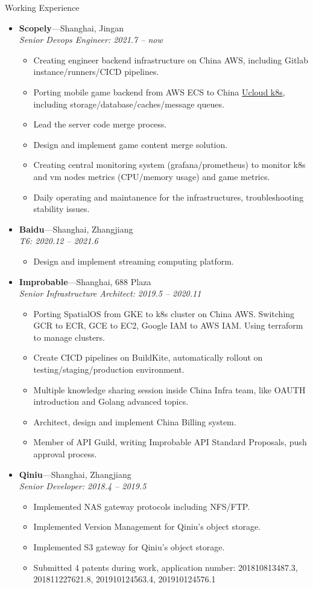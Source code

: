 \documentclass[11pt,oneside]{article}
\newenvironment{ressection}[1]{
	\vspace{4pt}
	{\selectfont\Large#1}
	\begin{itemize}
	\vspace{3pt}
}{
	\end{itemize}
}
\newcommand{\ressubitem}[1]{
	\vspace{-1pt}
	\item \begin{flushleft} #1 \end{flushleft}
}
\newcommand{\resbigitem}[3]{
	\vspace{-5pt}
	\item
	\textbf{#1}---#2 \\
	\textit{#3}
}
\newenvironment{ressubsec}[3]{
	\resbigitem{#1}{#2}{#3}
	\vspace{-2pt}
	\begin{itemize}
}{
    \end{itemize}
}
\begin{document}
\begin{ressection}{Working Experience}

	\begin{ressubsec}{Scopely}{Shanghai, Jingan}{Senior Devops Engineer: 2021.7 -- now}
		\ressubitem{Creating engineer backend infrastructure on China AWS, including Gitlab instance/runners/CICD pipelines.}
		\ressubitem{Porting mobile game backend from AWS ECS to China \href{ucloud.cn}{Ucloud k8s}, including storage/database/caches/message queues.}
		\ressubitem{Lead the server code merge process.}
		\ressubitem{Design and implement game content merge solution.}
		\ressubitem{Creating central monitoring system (grafana/prometheus) to monitor k8s and vm nodes metrics (CPU/memory usage) and game metrics.}
		\ressubitem{Daily operating and maintanence for the infrastructures, troubleshooting stability issues.}
	\end{ressubsec}

	\begin{ressubsec}{Baidu}{Shanghai, Zhangjiang}{T6: 2020.12 -- 2021.6}
		\ressubitem{Design and implement streaming computing platform.}
	\end{ressubsec}

	\begin{ressubsec}{Improbable}{Shanghai, 688 Plaza}{Senior Infrastructure Architect: 2019.5 -- 2020.11}
		\ressubitem{Porting SpatialOS from GKE to k8s cluster on China AWS. Switching GCR to ECR, GCE to EC2, Google IAM to AWS IAM. Using terraform to manage clusters.}
		\ressubitem{Create CICD pipelines on BuildKite, automatically rollout on testing/staging/production environment.}
		\ressubitem{Multiple knowledge sharing session inside China Infra team, like OAUTH introduction and Golang advanced topics.}
		\ressubitem{Architect, design and implement China Billing system.}
		\ressubitem{Member of API Guild, writing Improbable API Standard Proposals, push approval process.}
	\end{ressubsec}

	\begin{ressubsec}{Qiniu}{Shanghai, Zhangjiang}{Senior Developer: 2018.4 -- 2019.5}
		\ressubitem{Implemented NAS gateway protocols including NFS/FTP.}
		\ressubitem{Implemented Version Management for Qiniu's object storage.}
		\ressubitem{Implemented S3 gateway for Qiniu's object storage.}
		\ressubitem{Submitted 4 patents during work, application number: 201810813487.3, 201811227621.8, 201910124563.4, 201910124576.1}
	\end{ressubsec}


\end{ressection}
\end{document}
